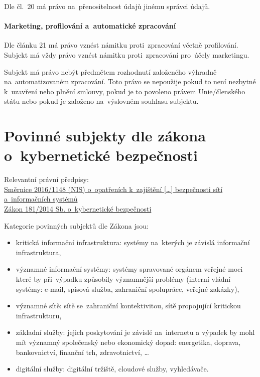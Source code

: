 Dle čl.~20 má právo na~přenositelnost údajů jinému správci údajů.

\paragraph{Marketing, profilování a~automatické zpracování}

Dle článku 21 má právo vznést námitku proti~zpracování včetně profilování.
Subjekt má vždy právo vznést námitku proti~zpracování pro~účely marketingu.

Subjekt má právo nebýt předmětem rozhodnutí založeného výhradně na~automatizovaném zpracování.
Toto právo se nepoužije pokud to není nezbytné k~uzavření nebo plnění smlouvy, pokud je to povoleno právem Unie/členského státu nebo pokud je založeno na~výslovném souhlasu subjektu.


\clearpage
\section{Povinné subjekty dle zákona o~kybernetické bezpečnosti}

{}Relevantní právní předpisy:
\\\href{https://eur-lex.europa.eu/legal-content/CS/TXT/?uri=uriserv:OJ.L_.2016.194.01.0001.01.CES
}{Směrnice 2016/1148 (NIS) o~opatřeních k~zajištění [\dots] bezpečnosti sítí a~informačních systémů}
\\\href{https://www.zakonyprolidi.cz/cs/2014-181}{Zákon 181/2014 Sb. o~kybernetické bezpečnosti}

Kategorie povinných subjektů dle Zákona jsou:

\begin{itemize}
\item kritická informační infrastruktura: systémy na~kterých je závislá informační infrastruktura,
\item významné informační systémy: systémy spravované orgánem veřejné moci které by při~výpadku způsobily významnější problémy (interní vládní systémy: e-mail, spisová služba, zahraniční spolupráce, veřejné zakázky),
\item významné sítě: sítě se~zahraniční kontektivitou, sítě propojující kritickou infrastrukturu,
\item základní služby: jejich poskytování je závislé na~internetu a výpadek by mohl mít významný společenský nebo ekonomický dopad: energetika, doprava, bankovnictví, finanční trh, zdravotnictví, \dots
\item digitální služby: digitální tržiště, cloudové služby, vyhledávače.
\end{itemize}

